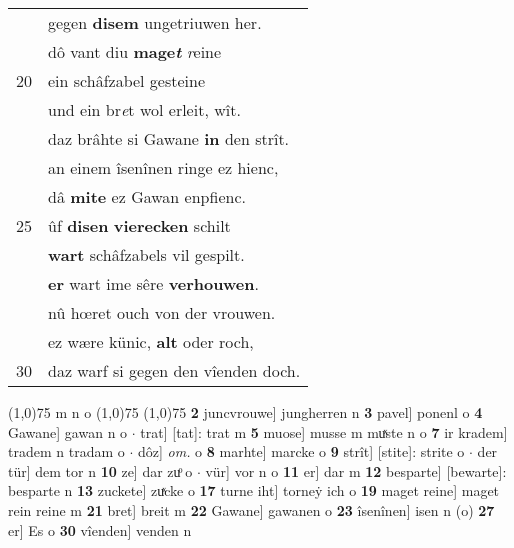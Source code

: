 \documentclass[8pt,a4paper,notitlepage]{article}
\begin{document}
\begin{table}[ht]
\begin{minipage}[t]{0.5\linewidth}
\begin{tabular}{rl}
 & gegen \textbf{disem} ungetriuwen her.\\ 
 & dô vant diu \textbf{mage\textit{t}} \textit{r}eine\\ 
20 & ein schâfzabel gesteine\\ 
 & und ein br\textit{e}t wol erleit, wît.\\ 
 & daz brâhte si Gawane \textbf{in} den strît.\\ 
 & an einem îsenînen ringe ez hienc,\\ 
 & dâ \textbf{mite} ez Gawan enpfienc.\\ 
25 & ûf \textbf{disen} \textbf{vierecken} schilt\\ 
 & \textbf{wart} schâfzabels vil gespilt.\\ 
 & \textbf{er} wart ime sêre \textbf{verhouwen}.\\ 
 & nû hœret ouch von der vrouwen.\\ 
 & ez wære künic, \textbf{alt} oder roch,\\ 
30 & daz warf si gegen den vîenden doch.\\ 
\end{tabular}
\scriptsize
\line(1,0){75} \newline
m n o \newline
\line(1,0){75} \newline
\newline
\line(1,0){75} \newline
\textbf{2} juncvrouwe] jungherren n \textbf{3} pavel] ponenl o \textbf{4} Gawane] gawan n o  $\cdot$ trat] [tat]: trat m \textbf{5} muose] musse m muͯste n o \textbf{7} ir kradem] tradem n tradam o  $\cdot$ dôz] \textit{om.} o \textbf{8} marhte] marcke o \textbf{9} strît] [stite]: strite o  $\cdot$ der tür] dem tor n \textbf{10} ze] dar zuͦ o  $\cdot$ vür] vor n o \textbf{11} er] dar m \textbf{12} besparte] [bewarte]: besparte n \textbf{13} zuckete] zuͯcke o \textbf{17} turne iht] torneẏ ich o \textbf{19} maget reine] maget rein reine m \textbf{21} bret] breit m \textbf{22} Gawane] gawanen o \textbf{23} îsenînen] isen n (o) \textbf{27} er] Es o \textbf{30} vîenden] venden n \newline
\end{minipage}
\end{table}
\newpage
\end{document}
